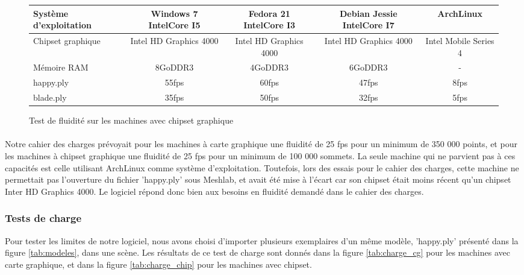 \begin{figure}[h]
  \begin{changemargin}{-4cm}{-4cm}
    \centering
    \begin{tabular}{|l|c|c|c|c|}
      \hline
      Système d'exploitation & Windows 7 IntelCore I5 & Fedora 21 IntelCore I3 & Debian Jessie IntelCore I7 & ArchLinux \\ \hline
      Chipset graphique &  Intel HD Graphics 4000 & Intel HD Graphics 4000 & Intel HD Graphics 4000 & Intel Mobile Series 4 \\ \hline
      Mémoire RAM & 8GoDDR3 & 4GoDDR3  & 6GoDDR3 & -\\ \hline \hline
      happy.ply & 55fps & 60fps & 47fps & 8fps\\ \hline
      blade.ply & 35fps & 50fps & 32fps & 5fps\\ \hline
    \end{tabular}
  \end{changemargin}
  \caption{Test de fluidité sur les machines avec chipset graphique}
  \label{tab:fps_chip}
\end{figure}

\paragraph{}
Notre cahier des charges prévoyait pour les machines à carte graphique une fluidité de 25 fps pour un minimum de 350 000 points, et pour les machines à chipset graphique une fluidité de 25 fps pour un minimum de 100 000 sommets. La seule machine qui ne parvient pas à ces capacités est celle utilisant ArchLinux comme système d'exploitation. Toutefois, lors des essais pour le cahier des charges, cette machine ne permettait pas l'ouverture du fichier 'happy.ply' sous Meshlab, et avait été mise à l'écart car son chipset était moins récent qu'un chipset Inter HD Graphics 4000. Le logiciel répond donc bien aux besoins en fluidité demandé dans le cahier des charges.

\subsubsection{Tests de charge}
Pour tester les limites de notre logiciel, nous avons choisi d'importer plusieurs exemplaires d'un même modèle, 'happy.ply' présenté dans la figure \ref{tab:modeles}, dans une scène. Les résultats de ce test de charge sont donnés dans la figure \ref{tab:charge_cg} pour les machines avec carte graphique, et dans la figure \ref{tab:charge_chip} pour les machines avec chipset.

